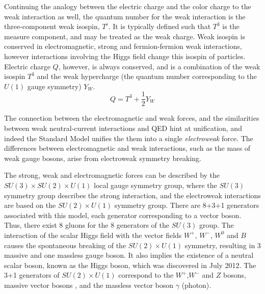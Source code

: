 \documentclass[12pt,a4paper,openright,twoside]{report}
\begin{document}
Continuing the analogy between the electric charge and the color charge to the weak interaction as well, the quantum number for the weak interaction is the three-component weak isospin, $T^i$. It is typically defined such that $T^3$ is the measure component, and may be treated as the weak charge. Weak isospin is conserved in electromagnetic, strong and fermion-fermion weak interactions, however interactions involving the Higgs field change this isospin of particles. Electric charge $Q$, however, is always conserved, and is a combination of the weak isospin $T^3$ and the weak hypercharge (the quantum number corresponding to the $U(1)$ gauge symmetry) $Y_W$.
$$
Q = T^3 + \frac{1}{2}Y_W
$$

The connection between the electromagnetic and weak forces, and the similarities between weak neutral-current interactions and QED hint at unification, and indeed the Standard Model unifies the them into a single \textit{electroweak} force. The differences between electromagnetic and weak interactions, such as the mass of weak gauge bosons, arise from electroweak symmetry breaking.

The strong, weak and electromagnetic forces can be described by the $SU(3)\times SU(2)\times U(1)$ local gauge symmetry group, where the $SU(3)$ symmetry group describes the strong interaction, and the electroweak interactions are based on the $SU(2)\times U(1)$ symmetry group. There are 8+3+1 generators associated with this model, each generator corresponding to a vector boson. Thus, there exist 8 gluons for the 8 generators of the $SU(3)$ group. The interaction of the scalar Higgs field with the vector fields $W^+$, $W^-$, $W^0$ and $B$ causes the spontaneous breaking of the $SU(2)\times U(1)$ symmetry, resulting in 3 massive and one massless gauge boson. It also implies the existence of a neutral scalar boson, known as the Higgs boson, which was discovered in July 2012\cite{Higgs,Higgs2}. The 3+1 generators of $SU(2)\times U(1)$ correspond to the $W^+$,$W^-$ and $Z$ bosons, massive vector bosons , and the massless vector boson $\gamma$ (photon).
\end{document}
